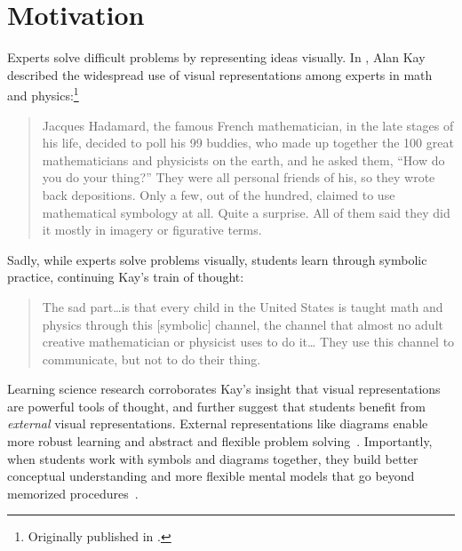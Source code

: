 \section{Motivation}
\label{sec:motivation}

Experts solve difficult problems by representing ideas visually. In , Alan Kay described the widespread use of visual representations among experts in math and physics:\footnote{Originally published in \cite{hadamard_mathematicians_1945, hadamard_mathematicians_1997}.}
\begin{quote}
Jacques Hadamard, the famous French mathematician, in the late stages of his life, decided to poll his 99 buddies, who made up together the 100 great mathematicians and physicists on the earth, and he asked them, ``How do you do your thing?'' They were all personal friends of his, so they wrote back depositions. Only a few, out of the hundred, claimed to use mathematical symbology at all. Quite a surprise. All of them said they did it mostly in imagery or figurative terms.
\end{quote}

\noindent Sadly, while experts solve problems visually, students learn through symbolic practice, continuing Kay's train of thought:

\begin{quote}
    The sad part\dots{}is that every child in the United States is taught math and physics through this [symbolic] channel, the channel that almost no adult creative mathematician or physicist uses to do it\dots{} They use this channel to communicate, but not to do their thing.~\cite{doingWithImages}
\end{quote}

Learning science research corroborates Kay's insight that visual representations are powerful tools of thought, and further suggest that students benefit from \textit{external} visual representations. External representations like diagrams enable more robust learning \cite{mayer_multimedia_2002} and abstract and flexible problem solving~\cite{koedinger_emergent_1992,perceptualChunks,whyDiagramWorth}. Importantly, when students work with symbols and diagrams together, they build better conceptual understanding and more flexible mental models that go beyond memorized procedures~\cite{multipleReps}. 

